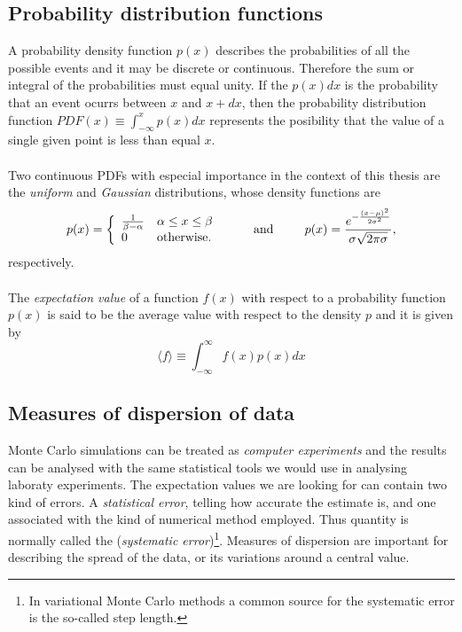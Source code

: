 \subsection{Probability distribution functions}
A probability density function $p(x)$ describes the probabilities of all the possible events and it may be discrete or continuous. Therefore the sum or integral of the probabilities must equal unity. If the $p(x)dx$ is the probability that an event ocurrs between $x$ and $x + dx$, then the probability distribution function $PDF(x) \equiv \int_{-\infty}^{x} p(x) dx$ represents the posibility that the value of a single given point is less than equal $x$.\\
\\
\noindent
Two continuous PDFs with especial importance in the context of this thesis are the \emph{uniform} and \emph{Gaussian} distributions, whose density functions are
\begin{equation}
p(x) = \left\{ 
\begin{array}{l l}
  \frac{1}{\beta - \alpha} & \mbox{$\alpha \leq x \leq \beta$} \\
 0 & \mbox{otherwise.}
\end{array} \right. \hspace{0.35in} \text{and} \hspace{0.35in} p(x) = \frac{e^{-\frac{(x-\mu)^2}{2\sigma^2}}}{\sigma \sqrt{2 \pi \sigma}},
\end{equation}
respectively.\\
\\
The \emph{expectation value} of a function $f(x)$ with respect to a probability function $p(x)$ is said to be the average value with respect to the density $p$ and it is given by
\begin{equation}\label{expectationValue}
 \langle f \rangle \equiv \int_{-\infty}^{\infty} f(x) p(x) dx
\end{equation}

\subsection{Measures of dispersion of data}
Monte Carlo simulations can be treated as {\em computer experiments} and the results can be a\-na\-ly\-sed with the same statistical tools we would use in analysing laboraty ex\-pe\-ri\-ments. The expectation values we are looking for can contain two kind of errors. A \emph{statistical error}, telling how accurate the estimate is, and one associated with the kind of numerical method employed. Thus quantity is normally called the  (\emph{systematic error})\footnote{In variational Monte Carlo methods  a common source for the systematic error is the so-called step length.}. Measures of dispersion are important for describing the spread of the data, or its variations around a central value.

